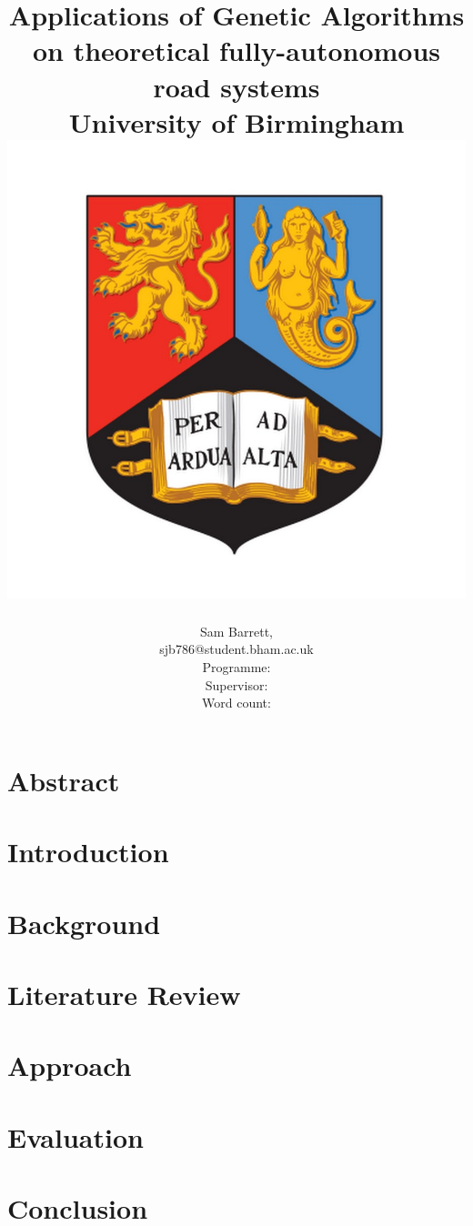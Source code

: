\documentclass[a4paper,11pt]{report}
\title{
	{Applications of Genetic Algorithms on theoretical fully-autonomous road systems} \\
	{\large University of Birmingham} \\ 
	{\includegraphics[scale=0.3]{uobcrest.jpg}}
}
\author{Sam Barrett, \ID \\ sjb786@student.bham.ac.uk \\ Programme: \programme \\ Supervisor: \supervisor \\ Word count: }
\begin{document}
\maketitle
\listoftodos

\chapter*{Abstract}\label{chap:Abs}

\tableofcontents
\chapter{Introduction}\label{chap:Intro}

\chapter{Background}\label{chap:Background}

\chapter{Literature Review}\label{chap:LitRev}

\chapter{Approach}\label{chap:ClassicalApproach}

\chapter{Evaluation}\label{chap:Eval}

\chapter{Conclusion}\label{chap:Conclusion}




\end{document}
